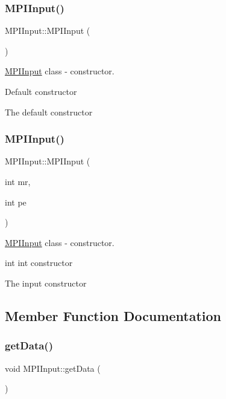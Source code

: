 \subsubsection{\texorpdfstring{M\+P\+I\+Input()}{MPIInput()}\hspace{0.1cm}{\footnotesize\ttfamily [1/2]}}
{\footnotesize\ttfamily M\+P\+I\+Input\+::\+M\+P\+I\+Input (\begin{DoxyParamCaption}{ }\end{DoxyParamCaption})}



\hyperlink{classMPIInput}{M\+P\+I\+Input} class -\/ constructor. 

Default constructor

The default constructor \mbox{\label{classMPIInput_aad9097968754daede74b4e9931f58c8a}} 
\subsubsection{\texorpdfstring{M\+P\+I\+Input()}{MPIInput()}\hspace{0.1cm}{\footnotesize\ttfamily [2/2]}}
{\footnotesize\ttfamily M\+P\+I\+Input\+::\+M\+P\+I\+Input (\begin{DoxyParamCaption}\item[{int}]{mr,  }\item[{int}]{pe }\end{DoxyParamCaption})}



\hyperlink{classMPIInput}{M\+P\+I\+Input} class -\/ constructor. 

int int constructor

The input constructor 

\subsection{Member Function Documentation}
\mbox{\label{classMPIInput_ab573f01916c4e35072009b95602a1399}} 
\subsubsection{\texorpdfstring{get\+Data()}{getData()}}
{\footnotesize\ttfamily void M\+P\+I\+Input\+::get\+Data (\begin{DoxyParamCaption}{ }\end{DoxyParamCaption})}

